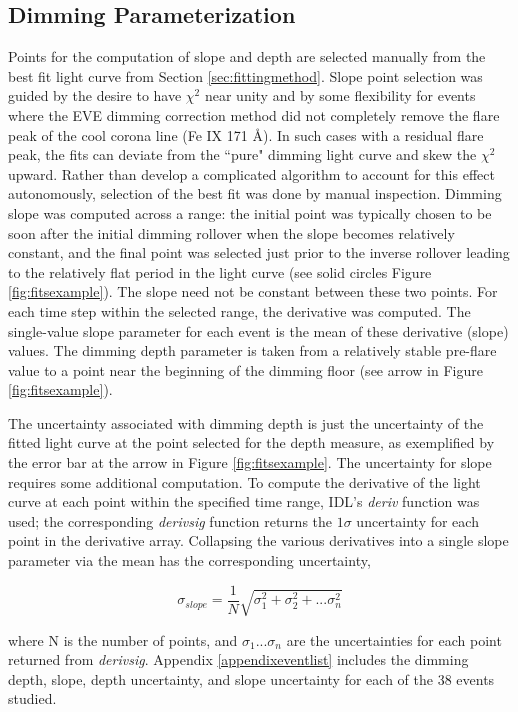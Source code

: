 \subsection{Dimming Parameterization}
Points for the computation of slope and depth are selected manually from the best fit light curve from Section \ref{sec:fittingmethod}. Slope point selection was guided by the desire to have $\chi^2$ near unity and by some flexibility for events where the EVE dimming correction method did not completely remove the flare peak of the cool corona line (Fe IX 171 \AA). In such cases with a residual flare peak, the fits can deviate from the ``pure" dimming light curve and skew the $\chi^2$ upward. Rather than develop a complicated algorithm to account for this effect autonomously, selection of the best fit was done by manual inspection. Dimming slope was computed across a range: the initial point was typically chosen to be soon after the initial dimming rollover when the slope becomes relatively constant, and the final point was selected just prior to the inverse rollover leading to the relatively flat period in the light curve (see solid circles Figure \ref{fig:fitsexample}). The slope need not be constant between these two points. For each time step within the selected range, the derivative was computed. The single-value slope parameter for each event is the mean of these derivative (slope) values. The dimming depth parameter is taken from a relatively stable pre-flare value to a point near the beginning of the dimming floor (see arrow in Figure \ref{fig:fitsexample}). 

The uncertainty associated with dimming depth is just the uncertainty of the fitted light curve at the point selected for the depth measure, as exemplified by the error bar at the arrow in Figure \ref{fig:fitsexample}. The uncertainty for slope requires some additional computation. To compute the derivative of the light curve at each point within the specified time range, IDL's \textit{deriv} function was used; the corresponding \textit{derivsig} function returns the $1\sigma$ uncertainty for each point in the derivative array. Collapsing the various derivatives into a single slope parameter via the mean has the corresponding uncertainty, 

\begin{equation*}
    \sigma _{slope} = \frac{1}{N}\sqrt{\sigma^2_1 + \sigma^2_2 + ... \sigma^2_n}
\end{equation*}

\noindent where N is the number of points, and $\sigma_1$...$\sigma_n$ are the uncertainties for each point returned from \textit{derivsig}. Appendix \ref{appendixeventlist} includes the dimming depth, slope, depth uncertainty, and slope uncertainty for each of the 38 events studied. 

